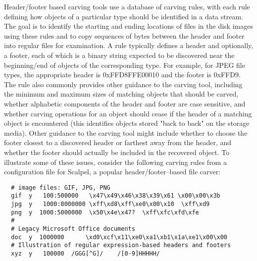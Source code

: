 Header/footer based carving tools use a database of carving rules, with each rule defining how objects of a particular type should be identified in a data stream.  The goal is to identify the starting and ending locations of files in the disk images using these rules and to copy sequences of bytes between the header and footer into regular files for examination.  A rule typically defines a header and optionally, a footer, each of which is a binary string expected to be discovered near the beginning/end of objects of the corresponding type.  For example, for JPEG file types, the appropriate header is 0xFFD8FFE00010 and the footer is 0xFFD9.  The rule also commonly provides other guidance to the carving tool, including the minimum and maximum sizes of matching objects that should be carved, whether alphabetic components of the header and footer are case sensitive, and whether carving operations for an object should cease if the header of a matching object is encountered (this identifies objects stored "back to back" on the storage media).  Other guidance to the carving tool might include whether to choose the footer closest to a discovered header or farthest away from the header, and whether the footer should actually be included in the recovered object.  To illustrate some of these issues, consider the following carving rules from a configuration file for Scalpel, a popular header/footer--based file carver:

{
\begin{Verbatim}
  # image files: GIF, JPG, PNG
  gif  y   100:500000   \x47\x49\x46\x38\x39\x61 \x00\x00\x3b
  jpg  y   1000:8000000 \xff\xd8\xff\xe0\x00\x10  \xff\xd9
  png  y  1000:5000000  \x50\x4e\x47?  \xff\xfc\xfd\xfe
  #
  # Legacy Microsoft Office documents
  doc  y  1000000      \xd0\xcf\x11\xe0\xa1\xb1\x1a\xe1\x00\x00 
  # Illustration of regular expression-based headers and footers
  xyz  y   100000  /GGG[^G]/    /[0-9]HHHHH/
\end{Verbatim}
}

